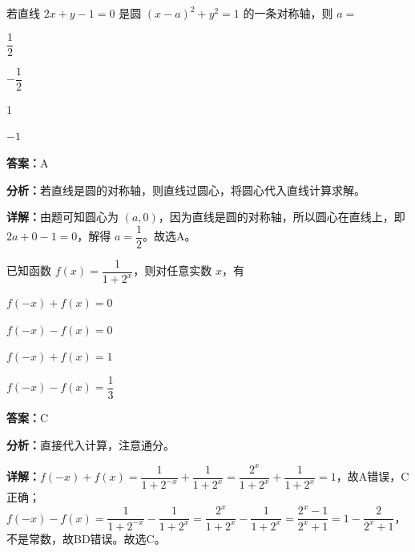 \begin{question}[points=4]
若直线 $2x + y - 1 = 0$ 是圆 $(x-a)^2 + y^2 = 1$ 的一条对称轴，则 $a =$
\begin{choices}
  \item $\dfrac{1}{2}$
  \item $-\dfrac{1}{2}$
  \item $1$
  \item $-1$
\end{choices}
\begin{solution}
\textbf{答案：}A

\textbf{分析：}若直线是圆的对称轴，则直线过圆心，将圆心代入直线计算求解。

\textbf{详解：}由题可知圆心为 $(a,0)$，因为直线是圆的对称轴，所以圆心在直线上，即 $2a + 0 - 1 = 0$，解得 $a = \dfrac{1}{2}$。故选A。
\end{solution}
\end{question}

\begin{question}[points=4]
已知函数 $f(x) = \dfrac{1}{1+2^x}$，则对任意实数 $x$，有
\begin{choices}
  \item $f(-x) + f(x) = 0$
  \item $f(-x) - f(x) = 0$
  \item $f(-x) + f(x) = 1$
  \item $f(-x) - f(x) = \dfrac{1}{3}$
\end{choices}
\begin{solution}
\textbf{答案：}C

\textbf{分析：}直接代入计算，注意通分。

\textbf{详解：}$f(-x) + f(x) = \dfrac{1}{1+2^{-x}} + \dfrac{1}{1+2^x} = \dfrac{2^x}{1+2^x} + \dfrac{1}{1+2^x} = 1$，故A错误，C正确；$f(-x) - f(x) = \dfrac{1}{1+2^{-x}} - \dfrac{1}{1+2^x} = \dfrac{2^x}{1+2^x} - \dfrac{1}{1+2^x} = \dfrac{2^x-1}{2^x+1} = 1 - \dfrac{2}{2^x+1}$，不是常数，故BD错误。故选C。
\end{solution}
\end{question}

